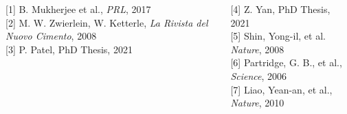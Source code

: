 \documentclass[26pt, paperwidth=36in,paperheight=48in]{tikzposter} %
\newcommand{\myfont}{\fontsize{26}{36}\selectfont}
\begin{document}
\begin{columns} 
	\block[roundedcorners=0]{\textcolor{BEC1blue}{References}}
	{
	\begin{minipage}{0.2\textwidth}
		\myfont
		{[1]} B. Mukherjee et al., \textit{PRL}, 2017\\
		{[2]} M. W. Zwierlein, W. Ketterle,  \textit{La Rivista del Nuovo Cimento}, 2008\\
		{[3]} P. Patel, PhD Thesis, 2021 
	\end{minipage}
	\hspace{0.2cm}
	\begin{minipage}{0.2\textwidth}
		\myfont
		{[4]} Z. Yan, PhD Thesis, 2021\\
		{[5]} Shin, Yong-il, et al. \textit{Nature}, 2008\\
		{[6]} Partridge, G. B., et al., \textit{Science}, 2006\\
		{[7]} Liao, Yean-an, et al., \textit{Nature}, 2010
	\end{minipage}
	\vspace{0.37cm}


	} 
	
	
	\block[roundedcorners=0]{\textcolor{BEC1blue}{Funding}}{

}
\end{columns}
\end{document}
